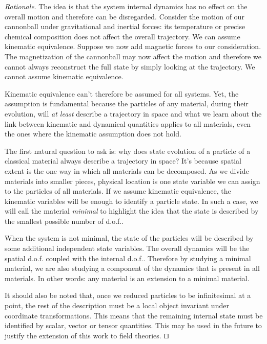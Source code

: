 \documentclass[smallextended]{svjour3}
\numberwithin{equation}{section}
\newenvironment{rationale}{\emph{Rationale}.}{\hfill\(\qed\)}
\begin{document}
\begin{rationale}
	The idea is that the system internal dynamics has no effect on the overall motion and therefore can be disregarded. Consider the motion of our cannonball under gravitational and inertial forces: its temperature or precise chemical composition does not affect the overall trajectory. We can assume kinematic equivalence. Suppose we now add magnetic forces to our consideration. The magnetization of the cannonball may now affect the motion and therefore we cannot always reconstruct the full state by simply looking at the trajectory. We cannot assume kinematic equivalence.
	
	Kinematic equivalence can't therefore be assumed for all systems. Yet, the assumption is fundamental because the particles of any material, during their evolution, will \emph{at least} describe a trajectory in space and what we learn about the link between kinematic and dynamical quantities applies to all materials, even the ones where the kinematic assumption does not hold.
	
	The first natural question to ask is: why does state evolution of a particle of a classical material always describe a trajectory in space? It's because spatial extent is the one way in which all materials can be decomposed. As we divide materials into smaller pieces, physical location is one state variable we can assign to the particles of all materials. If we assume kinematic equivalence, the kinematic variables will be enough to identify a particle state. In such a case, we will call the material \emph{minimal} to highlight the idea that the state is described by the smallest possible number of d.o.f..
	
	When the system is not minimal, the state of the particles will be described by some additional independent state variables. The overall dynamics will be the spatial d.o.f. coupled with the internal d.o.f.. Therefore by studying a minimal material, we are also studying a component of the dynamics that is present in all materials. In other words: any material is an extension to a minimal material.
	
	It should also be noted that, once we reduced particles to be infinitesimal at a point, the rest of the description must be a local object invariant under coordinate transformations. This means that the remaining internal state must be identified by scalar, vector or tensor quantities. This may be used in the future to justify the extension of this work to field theories. 
\end{rationale}
\end{document}
